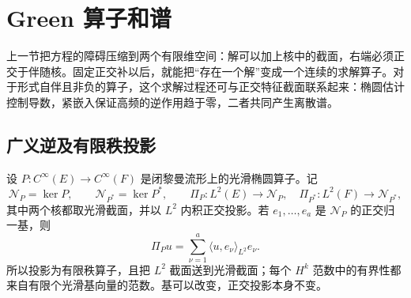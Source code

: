 
% 
% 

\section{Green 算子和谱}
\label{g3:sec:1303}

上一节把方程的障碍压缩到两个有限维空间：解可以加上核中的截面，右端必须正交于伴随核。固定正交补以后，就能把“存在一个解”变成一个连续的求解算子。对于形式自伴且非负的算子，这个求解过程还可与正交特征截面联系起来：椭圆估计控制导数，紧嵌入保证高频的逆作用趋于零，二者共同产生离散谱。

\subsection{广义逆及有限秩投影}
\label{g3:subsec:1303:01}
设 \(P:C^\infty(E)\to C^\infty(F)\) 是闭黎曼流形上的光滑椭圆算子。记
\[
	\mathcal N_P=\ker P,\qquad \mathcal N_{P^*}=\ker P^*,
	\qquad \Pi_P:L^2(E)\to \mathcal N_P,\quad
	\Pi_{P^*}:L^2(F)\to \mathcal N_{P^*},
\]
其中两个核都取光滑截面，并以 \(L^2\) 内积正交投影。若 \(e_1,\ldots,e_a\) 是 \(\mathcal N_P\) 的正交归一基，则
\[
	\Pi_Pu=\sum_{\nu=1}^a\langle u,e_\nu\rangle_{L^2}e_\nu.
\]
所以投影为有限秩算子，且把 \(L^2\) 截面送到光滑截面；每个 \(H^k\) 范数中的有界性都来自有限个光滑基向量的范数。基可以改变，正交投影本身不变。

